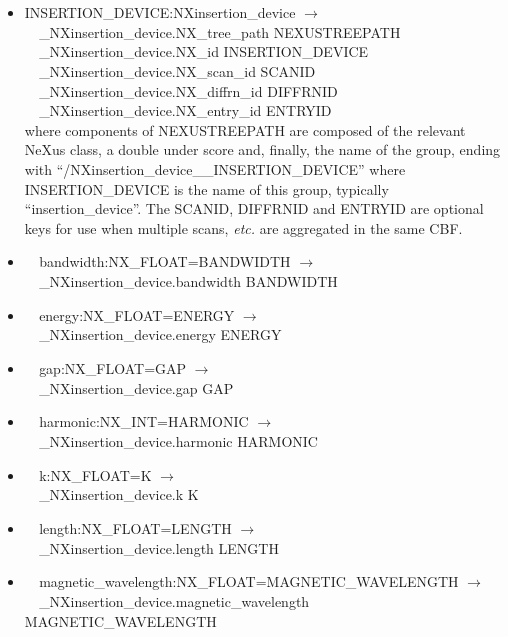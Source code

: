 \documentclass[11pt]{article}
\begin{document}
{{\begin{itemize}

\item{INSERTION\_DEVICE:NXinsertion\_device $\rightarrow$\\
\verb|  |\_NXinsertion\_device.NX\_tree\_path    NEXUSTREEPATH \\
\verb|  |\_NXinsertion\_device.NX\_id            INSERTION\_DEVICE\\
\verb|  |\_NXinsertion\_device.NX\_scan\_id      SCANID \\
\verb|  |\_NXinsertion\_device.NX\_diffrn\_id    DIFFRNID \\
\verb|  |\_NXinsertion\_device.NX\_entry\_id     ENTRYID \\
where components of NEXUSTREEPATH are composed of the
relevant NeXus class, a double under score and, finally, the
name of the group, ending with ``/NXinsertion\_device\_\_INSERTION\_DEVICE''
where INSERTION\_DEVICE is the name of this group, typically ``insertion\_device''.
The SCANID, DIFFRNID and ENTRYID are optional keys for use
when multiple scans, {\it etc.} are aggregated in the same CBF.}

\item{\verb|  |bandwidth:NX\_FLOAT=BANDWIDTH $\rightarrow$\\
\verb|  |\_NXinsertion\_device.bandwidth BANDWIDTH}

\item{\verb|  |energy:NX\_FLOAT=ENERGY $\rightarrow$\\
\verb|  |\_NXinsertion\_device.energy ENERGY}

\item{\verb|  |gap:NX\_FLOAT=GAP $\rightarrow$\\
\verb|  |\_NXinsertion\_device.gap GAP}

\item{\verb|  |harmonic:NX\_INT=HARMONIC $\rightarrow$\\
\verb|  |\_NXinsertion\_device.harmonic HARMONIC}

\item{\verb|  |k:NX\_FLOAT=K $\rightarrow$\\
\verb|  |\_NXinsertion\_device.k K}

\item{\verb|  |length:NX\_FLOAT=LENGTH $\rightarrow$\\
\verb|  |\_NXinsertion\_device.length LENGTH}

\item{\verb|  |magnetic\_wavelength:NX\_FLOAT=MAGNETIC\_WAVELENGTH $\rightarrow$\\
\verb|  |\_NXinsertion\_device.magnetic\_wavelength MAGNETIC\_WAVELENGTH}


\end{itemize}}}
\end{document}
